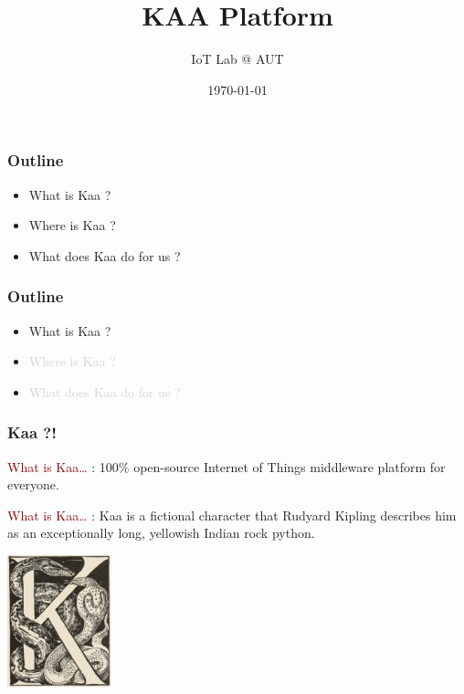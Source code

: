 \documentclass{beamer}
\title[Introduction to KAA Platform]{KAA Platform}
\author{IoT Lab @ AUT}
\institute[]{Amirkabir University of Technology}
\date{\today}
\begin{document}
\begin{frame}
\titlepage
\end{frame}


\begin{frame}
	\frametitle{Outline}
	\begin{itemize}
		\item What is Kaa ?
		\item Where is Kaa ?
		\item What does Kaa do for us ?
	\end{itemize}
\end{frame}

\begin{frame}
	\frametitle{Outline}
	\begin{itemize}
		\item What is Kaa ?
		\item \textcolor{LightGray}{Where is Kaa ?}
		\item \textcolor{LightGray}{What does Kaa do for us ?}
	\end{itemize}
\end{frame}

\begin{frame}
	\frametitle{Kaa ?!}
	\begin{block}{
		\centering\textcolor{darkred}{What is Kaa\ldots}}
		\justifying
		[Kaa]: 100\% open-source Internet of Things middleware platform for everyone.
	\end{block}
	\begin{block}{
		\centering\textcolor{darkred}{What is Kaa\ldots}}
		\justifying
		[Wikipedia]: Kaa is a fictional character that Rudyard Kipling describes him as
		an exceptionally long, yellowish Indian rock python.
	\end{block}
	\centering\includegraphics[width=3cm]{figs/kaa.jpeg}
\end{frame}
\end{document}
